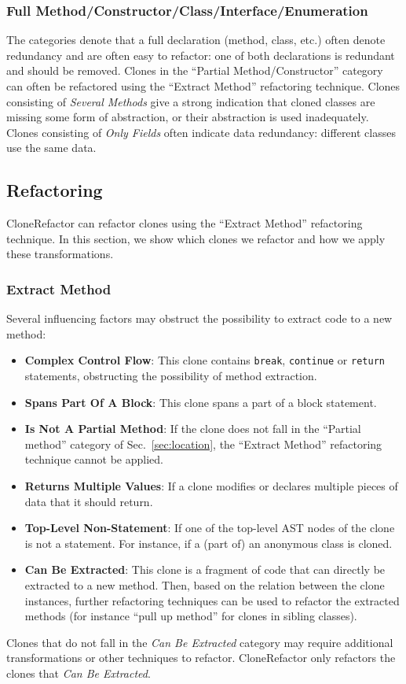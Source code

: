 \documentclass[sigconf,review, table]{acmart}
\begin{document}
\subsubsection{Full Method/Constructor/Class/Interface/Enumeration}
The categories denote that a full declaration (method, class, etc.) often denote redundancy and are often easy to refactor: one of both declarations is redundant and should be removed. Clones in the ``Partial Method/Constructor'' category can often be refactored using the ``Extract Method'' refactoring technique. Clones consisting of \textit{Several Methods} give a strong indication that cloned classes are missing some form of abstraction, or their abstraction is used inadequately. Clones consisting of \textit{Only Fields} often indicate data redundancy: different classes use the same data.

\subsection{Refactoring}
CloneRefactor can refactor clones using the ``Extract Method'' refactoring technique. In this section, we show which clones we refactor and how we apply these transformations.

\subsubsection{Extract Method}
Several influencing factors may obstruct the possibility to extract code to a new method:
\begin{itemize}
    \item \textbf{Complex Control Flow}: This clone contains \texttt{break}, \texttt{continue} or \texttt{return} statements, obstructing the possibility of method extraction.
    \item \textbf{Spans Part Of A Block}: This clone spans a part of a block statement.
    \item \textbf{Is Not A Partial Method}: If the clone does not fall in the ``Partial method'' category of Sec.~\ref{sec:location}, the ``Extract Method'' refactoring technique cannot be applied.
    \item \textbf{Returns Multiple Values}: If a clone modifies or declares multiple pieces of data that it should return.
    \item \textbf{Top-Level Non-Statement}: If one of the top-level AST nodes of the clone is not a statement. For instance, if a (part of) an anonymous class is cloned.
    \item \textbf{Can Be Extracted}: This clone is a fragment of code that can directly be extracted to a new method. Then, based on the relation between the clone instances, further refactoring techniques can be used to refactor the extracted methods (for instance ``pull up method'' for clones in sibling classes).
\end{itemize}
Clones that do not fall in the \textit{Can Be Extracted} category may require additional transformations or other techniques to refactor. CloneRefactor only refactors the clones that \textit{Can Be Extracted}.
\end{document}
